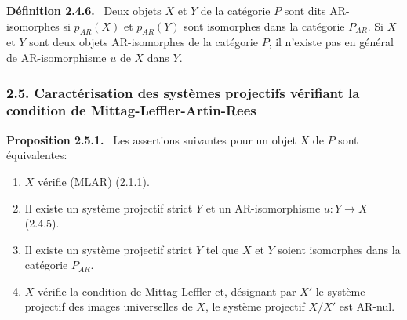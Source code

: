 \documentclass[11pt]{article}
\newenvironment{statement}[1]{\par\medskip\noindent\textbf{#1.}\ }{\par\medskip}
\begin{document}
\begin{statement}{Définition 2.4.6}
Deux objets $X$ et $Y$ de la catégorie $P$ sont dits AR-isomorphes si $p_{AR}(X)$ et $p_{AR}(Y)$ sont isomorphes dans la catégorie $P_{AR}$. Si $X$ et $Y$ sont deux objets AR-isomorphes de la catégorie $P$, il n'existe pas en général de AR-isomorphisme $u$ de $X$ dans $Y$.
\end{statement}

\subsubsection*{2.5. Caractérisation des systèmes projectifs vérifiant la condition de Mittag-Leffler-Artin-Rees}
\begin{statement}{Proposition 2.5.1}
Les assertions suivantes pour un objet $X$ de $P$ sont équivalentes:
\begin{enumerate}[label=(\roman*)]
\item $X$ vérifie (MLAR) (2.1.1).
\item Il existe un système projectif strict $Y$ et un AR-isomorphisme $u:Y\to X$ (2.4.5).
\item Il existe un système projectif strict $Y$ tel que $X$ et $Y$ soient isomorphes dans la catégorie $P_{AR}$.
\item $X$ vérifie la condition de Mittag-Leffler et, désignant par $X'$ le système projectif des images universelles de $X$, le système projectif $X/X'$ est AR-nul.
\end{enumerate}
\end{statement}
\end{document}
